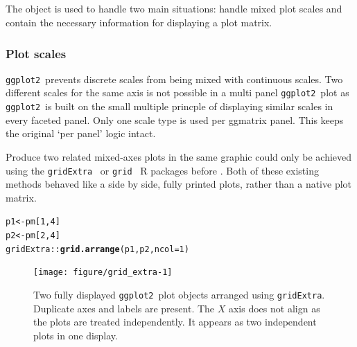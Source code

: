 \documentclass[stat,dissertation]{puthesis}\usepackage[]{graphicx}\usepackage{xcolor}
\makeatletter
\newcommand{\hlnum}[1]{\textcolor[rgb]{0.686,0.059,0.569}{#1}}%
\newcommand{\hlopt}[1]{\textcolor[rgb]{0,0,0}{#1}}%
\newcommand{\hlstd}[1]{\textcolor[rgb]{0.345,0.345,0.345}{#1}}%
\newcommand{\hlkwb}[1]{\textcolor[rgb]{0.69,0.353,0.396}{#1}}%
\newcommand{\hlkwc}[1]{\textcolor[rgb]{0.333,0.667,0.333}{#1}}%
\newcommand{\hlkwd}[1]{\textcolor[rgb]{0.737,0.353,0.396}{\textbf{#1}}}%
\newenvironment{kframe}{%
 \def\at@end@of@kframe{}%
 \ifinner\ifhmode%
  \def\at@end@of@kframe{\end{minipage}}%
  \begin{minipage}{\columnwidth}%
 \fi\fi%
 \def\FrameCommand##1{\hskip\@totalleftmargin \hskip-\fboxsep
 \colorbox{shadecolor}{##1}\hskip-\fboxsep
     \hskip-\linewidth \hskip-\@totalleftmargin \hskip\columnwidth}%
 \MakeFramed {\advance\hsize-\width
   \@totalleftmargin\z@ \linewidth\hsize
   \@setminipage}}%
 {\par\unskip\endMakeFramed%
 \at@end@of@kframe}
\newenvironment{knitrout}{}{} %
\renewenvironment{knitrout}{\setstretch{1}}{}
\newcommand{\pkg}[1]{\texttt{#1}}
\newcommand{\ggplot}{\pkg{ggplot2}}
\makeatother
\begin{document}
\subsection{}

The  object is used to handle two main situations: handle mixed plot scales and contain the necessary information for displaying a plot matrix.

\subsubsection{Plot scales}

\ggplot~prevents discrete scales from being mixed with continuous scales.  Two different scales for the same axis is not possible in a multi panel \ggplot~plot as \ggplot~is built on the small multiple princple of displaying similar scales in every faceted panel.  Only one scale type is used per ggmatrix panel.  This keeps the original `per panel' logic intact.

Produce two related mixed-axes plots in the same graphic could only be achieved using the \pkg{gridExtra}~\cite{gridExtra} or \pkg{grid}~\cite{r_project} R packages before .  Both of these existing methods behaved like a side by side, fully printed plots, rather than a native plot matrix.

\begin{knitrout}\small
{}\color{fgcolor}\begin{kframe}
\begin{alltt}
\hlstd{p1} \hlkwb{<-} \hlstd{pm[}\hlnum{1}\hlstd{,}\hlnum{4}\hlstd{]}
\hlstd{p2} \hlkwb{<-} \hlstd{pm[}\hlnum{2}\hlstd{,}\hlnum{4}\hlstd{]}
\hlstd{gridExtra}\hlopt{::}\hlkwd{grid.arrange}\hlstd{(p1, p2,} \hlkwc{ncol} \hlstd{=} \hlnum{1}\hlstd{)}
\end{alltt}
\end{kframe}\begin{figure}[H]

{\centering \texttt{[image: figure/grid\_extra-1]} 

}

\caption{Two fully displayed \ggplot~plot objects arranged using \pkg{gridExtra}. Duplicate axes and labels are present.  The $X$ axis does not align as the plots are treated independently.  It appears as two independent plots in one display.}\label{fig:grid_extra}
\end{figure}


\end{knitrout}
\end{document}
